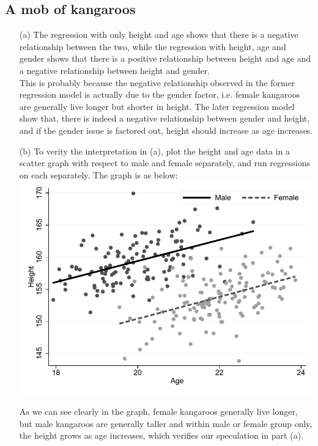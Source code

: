 \documentclass{article}
\begin{document}
\subsection*{A mob of kangaroos}
\begin{enumerate}
    \item[(a)] The regression with only height and age shows that there is a negative relationship between the two, while the regression with height, age and gender shows that there is a positive relationship between height and age and a negative relationship between height and gender. \\
    
    This is probably because the negative relationship observed in the former regression model is actually due to the gender factor, i.e. female kangaroos are generally live longer but shorter in height. The later regression model show that, there is indeed a negative relationship between gender and height, and if the gender issue is factored out, height should increase as age increases. \\
    
    \item[(b)] To verity the interpretation in (a), plot the height and age data in a scatter graph with respect to male and female separately, and run regressions on each separately. The graph is as below:\\
    
    \includegraphics{Graph1}
    
    As we can see clearly in the graph, female kangaroos generally live longer, but male kangaroos are generally taller and within male or female group only, the height grows as age increases, which verifies our speculation in part (a). \\
    
\end{enumerate}
\end{document}
